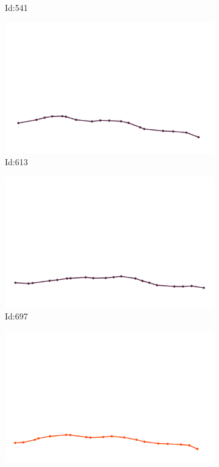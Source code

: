 \documentclass[12pt,twoside]{report}
\begin{document}
\begin{figure}
\begin{subfigure}[b]{0.20\textwidth}
\caption{Id:541}
\end{subfigure}
\begin{subfigure}[b]{0.20\textwidth}
\centering
\includegraphics[width=\textwidth]{../../trajectories/613.png}
\caption{Id:613}
\end{subfigure}
\begin{subfigure}[b]{0.20\textwidth}
\centering
\includegraphics[width=\textwidth]{../../trajectories/697.png}
\caption{Id:697}
\end{subfigure}
\begin{subfigure}[b]{0.20\textwidth}
\centering
\includegraphics[width=\textwidth]{../../trajectories/765.png}

\end{subfigure}
\end{figure}
\end{document}
